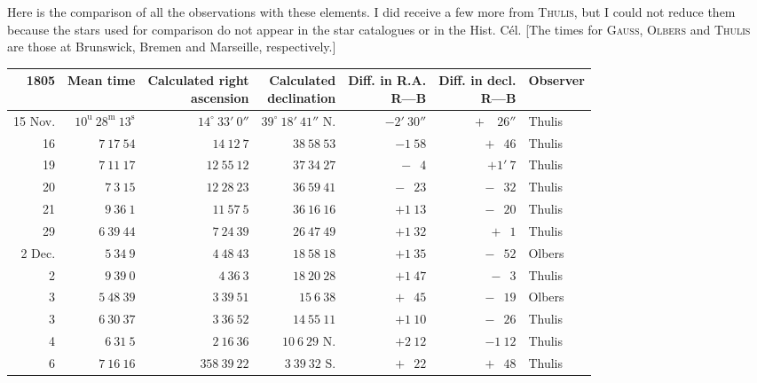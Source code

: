 \par\indent Here is the comparison of all the observations with these elements. I did receive a few more from \textsc{Thulis}, but I could not reduce them because the stars used for comparison do not appear in the star catalogues or in the Hist. Cél. [The times for \textsc{Gauss}, \textsc{Olbers} and \textsc{Thulis} are those at Brunswick, Bremen and Marseille, respectively.]
\begin{center}
\begingroup\fontsize{8}{10}\selectfont\setlength{\tabcolsep}{2pt}\renewcommand{\arraystretch}{1.1}
\begin{tabular}{r|r|r|r|r|r|l}
1805 & Mean time & \shortstack{Calculated right\\ascension} & \shortstack{Calculated\\declination} & \shortstack{Diff. in R.A.\\R---B} & \shortstack{Diff. in decl.\\R---B} & Observer\\ \hline
15 Nov. & $10^{\mathrm u}\ 28^{\mathrm m}\ 13^{\mathrm s}$ & $14^\circ\ 33'\ 0''$ & $39^\circ\ 18'\ 41''$ N. & $-2'\ 30''$ & $+\phantom{1'}\ 26''$ & Thulis\\
16 & $7\ 17\ 54$ & $14\ 12\ 7$ & $38\ 58\ 53$ & $-1\ 58$ & $+\phantom{1}\ 46$ & Thulis\\
19 & $7\ 11\ 17$ & $12\ 55\ 12$ & $37\ 34\ 27$ & $-\phantom{1}\ 4$ & $+1'\ 7$ & Thulis\\
20 & $7\ 3\ 15$ & $12\ 28\ 23$ & $36\ 59\ 41$ & $-\phantom{1}\ 23$ & $-\phantom{1}\ 32$ & Thulis\\
21 & $9\ 36\ 1$ & $11\ 57\ 5$ & $36\ 16\ 16$ & $+1\ 13$ & $-\phantom{1}\ 20$ & Thulis\\
29 & $6\ 39\ 44$ & $7\ 24\ 39$ & $26\ 47\ 49$ & $+1\ 32$ & $+\phantom{1}\ 1$ & Thulis\\
2 Dec. & $5\ 34\ 9$ & $4\ 48\ 43$ & $18\ 58\ 18$ & $+1\ 35$ & $-\phantom{1}\ 52$ & Olbers\\
2 & $9\ 39\ 0$ & $4\ 36\ 3$ & $18\ 20\ 28$ & $+1\ 47$ & $-\phantom{1}\ 3$ & Thulis\\
3 & $5\ 48\ 39$ & $3\ 39\ 51$ & $15\ 6\ 38$ & $+\phantom{1}\ 45$ & $-\phantom{1}\ 19$ & Olbers\\
3 & $6\ 30\ 37$ & $3\ 36\ 52$ & $14\ 55\ 11$ & $+1\ 10$ & $-\phantom{1}\ 26$ & Thulis\\
4 & $6\ 31\ 5$ & $2\ 16\ 36$ & $10\ 6\ 29$ N. & $+2\ 12$ & $-1\ 12$ & Thulis\\
6 & $7\ 16\ 16$ & $358\ 39\ 22$ & $3\ 39\ 32$ S. & $+\phantom{1}\ 22$ & $+\phantom{1}\ 48$ & Thulis\\

\end{tabular}
\end{center}
